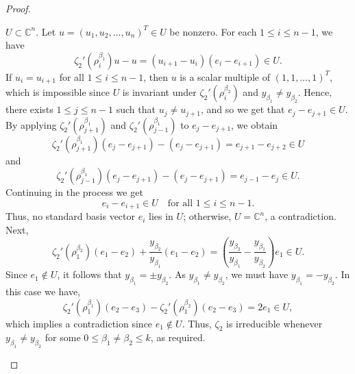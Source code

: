 \documentclass[10pt,a4paper]{amsart}
\begin{document}
\begin{proof}
\begin{itemize}
$U \subset \mathbb{C}^n$.
Let $u=(u_1,u_2,\ldots,u_n)^T \in U$ be nonzero. For each $1 \le i \le n-1$, we have
\[
\zeta_2'(\rho_i^{\beta_1})u - u
= (u_{i+1}-u_i)(e_i-e_{i+1}) \in U.
\]
If $u_i=u_{i+1}$ for all $1\leq i\leq n-1$, then $u$ is a scalar multiple of
$(1,1,\ldots,1)^T$, which is impossible since
$U$ is invariant under $\zeta_2'(\rho_i^{\beta_2})$ and
$y_{\beta_1} \neq y_{\beta_2}$.
Hence, there exists $1 \le j \le n-1$ such that $u_j\neq u_{j+1}$, and so we get that $e_j-e_{j+1} \in U$.
By applying $\zeta_2'(\rho_{j+1}^{\beta_1})$
and $\zeta_2'(\rho_{j-1}^{\beta_1})$ to $e_j-e_{j+1}$, we obtain
$$
\zeta_2'(\rho_{j+1}^{\beta_1})(e_j - e_{j+1})-(e_j - e_{j+1}) = e_{j+1} - e_{j+2} \in U
$$ 
and
$$\zeta_2'(\rho_{j-1}^{\beta_1})(e_j - e_{j+1})-(e_j - e_{j+1}) = e_{j-1} - e_j \in U.
$$
Continuing in the process we get 
\[
e_i-e_{i+1} \in U \quad \text{for all } 1 \le i \le n-1.
\]
Thus, no standard basis vector $e_i$ lies in $U$; otherwise,
$U=\mathbb{C}^n$, a contradiction.
Next,
\[
\zeta_2'(\rho_1^{\beta_2})(e_1-e_2)
+ \dfrac{y_{\beta_2}}{y_{\beta_1}}(e_1-e_2)
= \left(\dfrac{y_{\beta_2}}{y_{\beta_1}}
- \dfrac{y_{\beta_1}}{y_{\beta_2}}\right)e_1 \in U.
\]
Since $e_1 \notin U$, it follows that
$y_{\beta_1}=\pm y_{\beta_2}$.
As $y_{\beta_1}\neq y_{\beta_2}$, we must have
$y_{\beta_1}=-y_{\beta_2}$.
In this case we have,
\[
\zeta_2'(\rho_1^{\beta_1})(e_2-e_3)
-\zeta_2'(\rho_1^{\beta_2})(e_2-e_3)=2e_1 \in U,
\]
which implies a contradiction since $e_1\notin U$. Thus, $\zeta_2$ is irreducible whenever
$y_{\beta_1}\neq y_{\beta_2}$ for some $0\leq \beta_1 \neq \beta_2\leq k$, as required.\vspace{0.1cm}


\end{itemize}
\end{proof}
\end{document}
